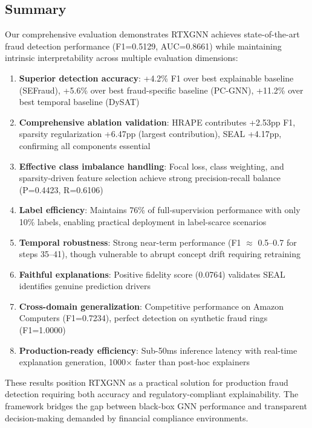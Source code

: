 \subsection{Summary}
\label{subsec:summary}

Our comprehensive evaluation demonstrates RTXGNN achieves state-of-the-art fraud detection performance (F1=0.5129, AUC=0.8661) while maintaining intrinsic interpretability across multiple evaluation dimensions:

\begin{enumerate}
    \item \textbf{Superior detection accuracy}: +4.2\% F1 over best explainable baseline (SEFraud), +5.6\% over best fraud-specific baseline (PC-GNN), +11.2\% over best temporal baseline (DySAT)
    \item \textbf{Comprehensive ablation validation}: HRAPE contributes +2.53pp F1, sparsity regularization +6.47pp (largest contribution), SEAL +4.17pp, confirming all components essential
    \item \textbf{Effective class imbalance handling}: Focal loss, class weighting, and sparsity-driven feature selection achieve strong precision-recall balance (P=0.4423, R=0.6106)
    \item \textbf{Label efficiency}: Maintains 76\% of full-supervision performance with only 10\% labels, enabling practical deployment in label-scarce scenarios
    \item \textbf{Temporal robustness}: Strong near-term performance (F1 $\approx$ 0.5--0.7 for steps 35--41), though vulnerable to abrupt concept drift requiring retraining
    \item \textbf{Faithful explanations}: Positive fidelity score (0.0764) validates SEAL identifies genuine prediction drivers
    \item \textbf{Cross-domain generalization}: Competitive performance on Amazon Computers (F1=0.7234), perfect detection on synthetic fraud rings (F1=1.0000)
    \item \textbf{Production-ready efficiency}: Sub-50ms inference latency with real-time explanation generation, 1000× faster than post-hoc explainers
\end{enumerate}

These results position RTXGNN as a practical solution for production fraud detection requiring both accuracy and regulatory-compliant explainability. The framework bridges the gap between black-box GNN performance and transparent decision-making demanded by financial compliance environments.